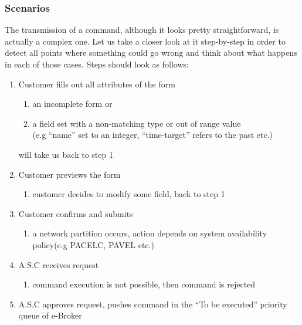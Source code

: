 \documentclass{article}
\begin{document}
\subsubsection{Scenarios}The transmission of a command, although it looks pretty straightforward, is actually a complex one. Let us take a closer look at it step-by-step in order to detect all points where something could go wrong and think about what happens in each of those cases. Steps should look as follows:\\
\begin{enumerate}
\item Customer fills out all attributes of the form
\begin{enumerate}
\item an incomplete form or
\item a field set with a non-matching type or out of range value\\(e.g ``name'' set to an integer, ``time-target'' refers to the past etc.) 
\end{enumerate} 
will take us back to step 1 
\item Customer previews the form
\begin{enumerate}
\item customer decides to modify some field, back to step 1
\end{enumerate}
\item Customer confirms and submits
\begin{enumerate}
\item a network partition occurs, action depends on system availability policy(e.g PACELC, PAVEL etc.) 
\end{enumerate}
\item A.S.C receives request
\begin{enumerate}
\item command execution is not possible, then command is rejected
\end{enumerate}
\item A.S.C approves request, pushes command in the ``To be executed'' priority queue of e-Broker 
\end{enumerate} 
\end{document}

